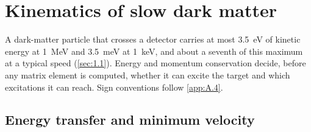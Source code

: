\section{Kinematics of slow dark matter}\label{sec:1.3}

A dark-matter particle that crosses a detector carries at most \SI{3.5}{eV} of kinetic energy at \SI{1}{MeV} and \SI{3.5}{meV} at \SI{1}{keV}, and about a seventh of this maximum at a typical speed (\cref{sec:1.1}). Energy and momentum conservation decide, before any matrix element is computed, whether it can excite the target and which excitations it can reach. Sign conventions follow \cref{app:A.4}.

\subsection{Energy transfer and minimum velocity}

